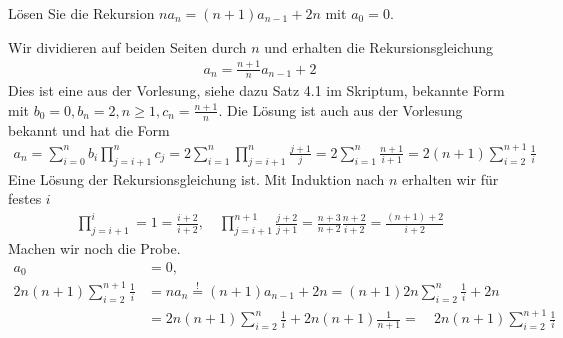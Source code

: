 
\begin{exercise}

	Lösen Sie die Rekursion $n a_n = (n + 1) a_{n - 1} + 2n$ mit $a_0 = 0$.

\end{exercise}


\begin{solution}

	Wir dividieren auf beiden Seiten durch $n$ und erhalten die Rekursionsgleichung
	\begin{align*}
	a_n = \frac{n + 1}{n} a_{n - 1} + 2
	\end{align*}
	Dies ist eine aus der Vorlesung, siehe dazu Satz 4.1 im Skriptum, bekannte Form mit $b_0 = 0, b_n = 2, n \geq 1, c_n = \frac{n+1}{n}$. Die Lösung ist auch aus der Vorlesung bekannt und hat die Form
	\begin{align*}
	a_n = \sum_{i=0}^nb_i\prod_{j=i+1}^nc_j
	= 2\sum_{i=1}^n\prod_{j=i+1}^n\frac{j+1}{j} = 2\sum_{i=1}^n\frac{n+1}{i+1}
	= 2(n+1)\sum_{i=2}^{n+1}\frac{1}{i}
	\end{align*}
	Eine Lösung der Rekursionsgleichung ist. Mit Induktion nach $n$ erhalten wir für festes $i$
	\begin{align*}
	\prod_{j=i+1}^i = 1 = \frac{i + 2}{i + 2}, \quad \prod_{j = i+1}^{n + 1} \frac{j + 2}{j + 1} = \frac{n + 3}{n + 2} \frac{n + 2}{i + 2} = \frac{(n + 1) + 2}{i + 2}
	\end{align*}
	Machen wir noch die Probe.
	\begin{align*}
	a_0 &= 0, \\
	2n(n + 1) \sum_{i = 2}^{n + 1} \frac{1}{i} &= n a_n \stackrel{!}{=} (n + 1) a_{n - 1} + 2n = (n + 1) 2n \sum_{i = 2}^{n} \frac{1}{i} + 2n \\
	&= 2n (n + 1)  \sum_{i = 2}^{n} \frac{1}{i} + 2n (n + 1) \frac{1}{n + 1} = \quad 2n(n + 1) \sum_{i = 2}^{n + 1} \frac{1}{i}
	\end{align*}
\end{solution}



